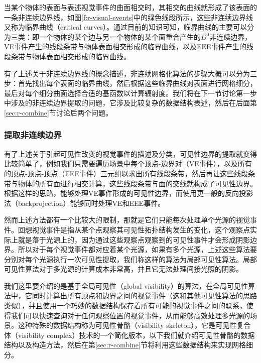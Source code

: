 当某个物体的表面与表述视觉事件的曲面相交时，其相交的曲线就形成了该表面的一条非连续边界线，如图\ref{f:r-visual-events}中的绿色线段所示，这些非连续边界线又称为临界曲线（critical curves）。通过目前的知识可知，临界曲线的主要可以分为三类：即一个物体的某个边与另一个物体的某个面重合产生的$D^{0}$非连续边界，VE事件产生的线段条带与物体表面相交形成的临界曲线，以及EEE事件产生的线段条带与物体表面相交形成的临界曲线。

有了上述关于非连续边界线的概念描述，非连续网格化算法的步骤大概可以分为三步：首先找出每个表面的临界曲线，然后根据这些临界曲线对表面进行网格细分，最后对每个细分曲面选择合适的基函数以计算辐射度。我们将在下一节讨论第一步中涉及的非连续边界提取的问题，它涉及比较复杂的数据结构表述，然后在后面第\ref{sec:r-combine}节讨论后两个问题。




\subsubsection{提取非连续边界}\label{sec:r-critical-curves}
有了上述关于引起可见性改变的视觉事件的描述及分类，可见性边界的提取就变得比较简单了，例如我们只需要遍历场景中每个顶点-边界对（VE事件），以及所有的顶点-顶点-顶点（EEE事件）三元组以求出所有线段条带，然后再让这些线段条带与物体的所有面进行相交计算，这些线段条带与面的交线就构成了可见性边界。根据这样的思路，\cite{a:ADiscontinuityMeshingAlgorithmforAccurateRadiosity,a:DiscontinuityMeshingforRadiosity}能够处理VE事件形成的可见性边界，而\cite{a:Fastcomputationofshadowboundariesusingspatialcoherenceandbackprojections,a:AFastShadowAlgorithmforAreaLightSourcesUsingBackprojection}使用更一般的反向投影法（backprojection）能够同时处理VE和EEE事件。

然而上述方法都有一个比较大的限制，那就是它们只能每次处理单个光源的视觉事件。回想视觉事件是指从某个点观察其可见性拓扑结构发生的变化，这个观察点实际上就是落于光源上的，因为通过这些观察点观察到的可见性事件才会形成阴影边界。所以对于每个视觉事件都对应着某个光源，如果有多个光源，上述这些算法要分别对每个光源执行一次可见性提取，我们称这样的算法为局部可见性算法。局部可见性算法对于多光源的计算成本非常高，并且它无法处理间接光照的阴影。

我们这里要介绍的是基于全局可见性（global visibility）的算法，在全局可见性算法中，它同时计算出所有顶点和边界之间的视觉事件（这和其他可见性算法的思路类似），并且使用一个巧妙的数据结构保存着所有可能的视觉事件之间的联系，使得我们可以快速查询对于任何观察位置的视觉事件，从而能够高效处理多光源的场景。这种特殊的数据结构称为可见性骨骼（visibility skeleton）\cite{a:TheVisibilitySkeleton:APowerfulAndEfficientMulti-PurposeGlobalVisibilityTool}，它是可见性复合体（visibility complex）技术\cite{a:The3Dvisibilitycomplex:anewapproachtotheproblemsofaccuratevisibility}的一个简化版本，以下我们就介绍可见性骨骼的数据结构以及构造方法，然后在第\ref{sec:r-combine}节将利用这些数据结构来实现网格细分。





